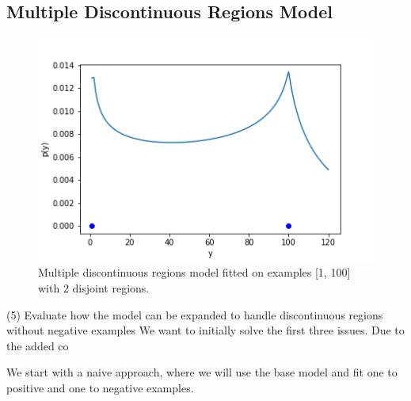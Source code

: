 \documentclass[12pt, ]{scrartcl}
\begin{document}
\begin{multicols}{2}
\section{Multiple Discontinuous Regions Model}
\begin{figure}
	\centering
	\includegraphics{graphics/mprm_model}
	\caption{Multiple discontinuous regions model fitted on examples [1, 100] with 2 disjoint regions.}
\end{figure}
(5) Evaluate how the model can be expanded to handle discontinuous regions without
negative examples
We want to initially solve the first three issues. Due to the added co

We start with a naive approach, where we will use the base model and fit one to positive and one to negative examples.

\centering

\nocite{*}
\printbibliography
\end{multicols}
\end{document}
